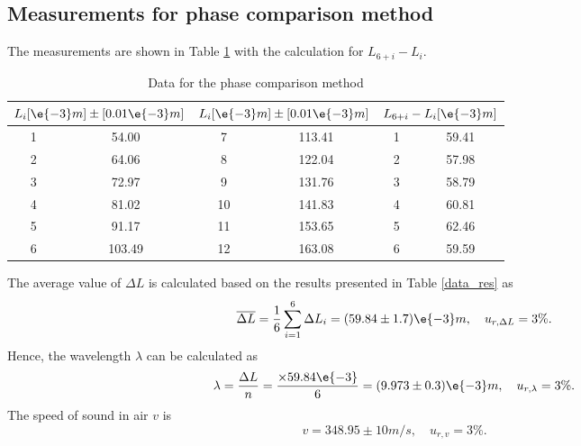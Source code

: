 \subsection{Measurements for phase comparison method}
    The measurements are shown in Table \ref{data_pha} with the calculation for $L_{6+i}-L_i$.
    \begin{table}[h] \small
        \centering
        \begin{tabular}{|c|c|c|c|c|c|}
        \hline
            \multicolumn{2}{|c|}{$L_i[\e{-3}m]\pm[0.01\e{-3}m]$} & 
            \multicolumn{2}{|c|}{$L_i[\e{-3}m]\pm[0.01\e{-3}m]$} &
            \multicolumn{2}{|c|}{$L_{6+i}-L_i[\e{-3}m]$}\\\hline
            1 & 54.00 & 7 & 113.41 & 1 & 59.41 \\\hline
            2 & 64.06 & 8 & 122.04 & 2 & 57.98 \\\hline
            3 & 72.97 & 9 & 131.76 & 3 & 58.79 \\\hline
            4 & 81.02 & 10 & 141.83 & 4 & 60.81 \\\hline
            5 & 91.17 & 11 & 153.65 & 5 & 62.46 \\\hline
            6 & 103.49 & 12 & 163.08 & 6 & 59.59 \\\hline
        \end{tabular}
        \caption{Data for the phase comparison method}\label{data_pha}
    \end{table}
    The average value of $\Delta L$ is calculated  based on the results presented in Table \ref{data_res} as
    \[
        \overline{\Delta L}=\frac{1}{6}\sum_{i=1}^{6}\Delta L_i=(59.84\pm 1.7)\e{-3}m,\quad u_{r,\Delta L}=3\%.
    \]
    Hence, the wavelength $\lambda$ can be calculated as
    \[
        \lambda=\frac{\Delta L}{n}=\frac{\times59.84\e{-3}}{6}=(9.973\pm0.3)\e{-3}m,\quad u_{r,\lambda}=3\%.
    \]
    The speed of sound in air $v$ is
    \[
        v=348.95\pm10 m/s,\quad u_{r,v}=3\%.
    \]

